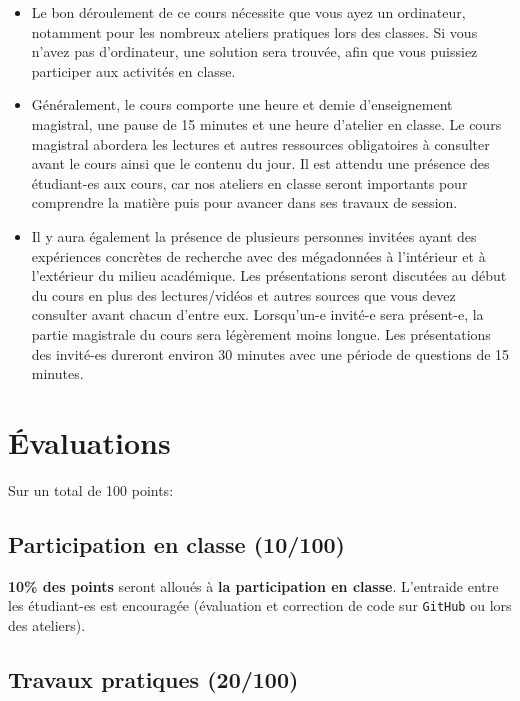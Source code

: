 \documentclass[
  letterpaper,
  DIV=11,
  numbers=noendperiod]{scrartcl}
\begin{document}
\begin{itemize}
\item
  Le bon déroulement de ce cours nécessite que vous ayez un ordinateur,
  notamment pour les nombreux ateliers pratiques lors des classes. Si
  vous n'avez pas d'ordinateur, une solution sera trouvée, afin que vous
  puissiez participer aux activités en classe.
\item
  Généralement, le cours comporte une heure et demie d'enseignement
  magistral, une pause de 15 minutes et une heure d'atelier en classe.
  Le cours magistral abordera les lectures et autres ressources
  obligatoires à consulter avant le cours ainsi que le contenu du jour.
  Il est attendu une présence des étudiant-es aux cours, car nos
  ateliers en classe seront importants pour comprendre la matière puis
  pour avancer dans ses travaux de session.
\item
  Il y aura également la présence de plusieurs personnes invitées ayant
  des expériences concrètes de recherche avec des mégadonnées à
  l'intérieur et à l'extérieur du milieu académique. Les présentations
  seront discutées au début du cours en plus des lectures/vidéos et
  autres sources que vous devez consulter avant chacun d'entre eux.
  Lorsqu'un-e invité-e sera présent-e, la partie magistrale du cours
  sera légèrement moins longue. Les présentations des invité-es dureront
  environ 30 minutes avec une période de questions de 15 minutes.
\end{itemize}

\section{Évaluations}\label{uxe9valuations}

Sur un total de 100 points:

\subsection{Participation en classe
(10/100)}\label{participation-en-classe-10100}

\textbf{10\% des points} seront alloués à \textbf{la participation en
classe}. L'entraide entre les étudiant-es est encouragée (évaluation et
correction de code sur \texttt{GitHub} ou lors des ateliers).

\subsection{Travaux pratiques (20/100)}\label{travaux-pratiques-20100}
\end{document}
